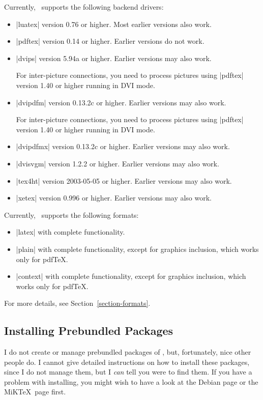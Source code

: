 Currently, \pgfname\ supports the following backend drivers:
%
\begin{itemize}
    \item |luatex| version 0.76 or higher. Most earlier versions also work.
    \item |pdftex| version 0.14 or higher. Earlier versions do not work.
    \item |dvips| version 5.94a or higher. Earlier versions may also work.

        For inter-picture connections, you need to process pictures using
        |pdftex| version 1.40 or higher running in DVI mode.
    \item |dvipdfm| version 0.13.2c or higher. Earlier versions may also
        work.

        For inter-picture connections, you need to process pictures using
        |pdftex| version 1.40 or higher running in DVI mode.
    \item |dvipdfmx| version 0.13.2c or higher. Earlier versions may also
        work.
    \item |dvisvgm| version 1.2.2 or higher. Earlier versions may also work.
    \item |tex4ht| version 2003-05-05 or higher. Earlier versions may also
        work.
    \item |xetex| version 0.996 or higher. Earlier versions may also work.
\end{itemize}

Currently, \pgfname\ supports the following formats:
%
\begin{itemize}
    \item |latex| with complete functionality.
    \item |plain| with complete functionality, except for graphics inclusion,
        which works only for pdf\TeX.
    \item |context| with complete functionality, except for graphics
        inclusion, which works only for pdf\TeX.
\end{itemize}

For more details, see Section~\ref{section-formats}.


\subsection{Installing Prebundled Packages}

I do not create or manage prebundled packages of \pgfname, but, fortunately,
nice other people do. I cannot give detailed instructions on how to install
these packages, since I do not manage them, but I \emph{can} tell you were to
find them. If you have a problem with installing, you might wish to have a look
at the Debian page or the MiK\TeX\ page first.


